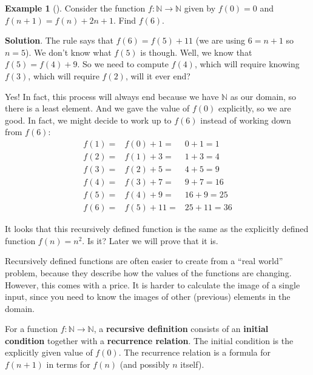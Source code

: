 \documentclass[10pt,]{book}
\newcommand{\terminology}[1]{\textbf{#1}}
\theoremstyle{plain}
\theoremstyle{definition}
\theoremstyle{definition}
\newtheorem{example}[theorem]{Example}
\theoremstyle{definition}
\theoremstyle{definition}
\numberwithin{equation}{chapter}
\def\N{\mathbb N}
\newcommand{\amp}{&}
\begin{document}
\begin{example}[]\label{example-48}
\hypertarget{p-1616}{}%
Consider the function \(f:\N \to \N\) given by \(f(0) = 0\) and \(f(n+1) = f(n) + 2n+1\).  Find \(f(6)\).%
\par\smallskip%
\noindent\textbf{Solution}.\hypertarget{solution-141}{}\quad%
\hypertarget{p-1617}{}%
The rule says that \(f(6) = f(5) + 11\) (we are using \(6 = n+1\) so \(n = 5\)).  We don't know what \(f(5)\) is though.  Well, we know that \(f(5) = f(4) + 9\).  So we need to compute \(f(4)\), which will require knowing \(f(3)\), which will require \(f(2)\),\textellipsis{} will it ever end?%
\par
\hypertarget{p-1618}{}%
Yes!  In fact, this process will always end because we have \(\N\) as our domain, so there is a least element.  And we gave the value of \(f(0)\) explicitly, so we are good.  In fact, we might decide to work up to \(f(6)\) instead of working down from \(f(6)\):%
\begin{align*}
f(1) = \amp f(0) + 1 = \amp 0 + 1 = 1\\
f(2) = \amp f(1) + 3 = \amp 1 + 3 = 4\\
f(3) = \amp f(2) + 5 = \amp 4 + 5 = 9\\
f(4) = \amp f(3) + 7 = \amp 9 + 7 = 16\\
f(5) = \amp f(4) + 9 = \amp 16 + 9 = 25\\
f(6) = \amp f(5) + 11 = \amp 25 + 11 = 36
\end{align*}
%
\par
\hypertarget{p-1619}{}%
It looks that this recursively defined function is the same as the explicitly defined function \(f(n) = n^2\).  Is it?  Later we will prove that it is.%
\end{example}
\hypertarget{p-1620}{}%
Recursively defined functions are often easier to create from a ``real world'' problem, because they describe how the values of the functions are changing.  However, this comes with a price. It is harder to calculate the image of a single input, since you need to know the images of other (previous) elements in the domain.%
\begin{assemblage}\label{assemblage-26}
\hypertarget{p-1621}{}%
For a function \(f:\N \to \N\), a \terminology{recursive definition} consists of an \terminology{initial condition} together with a \terminology{recurrence relation}.  The initial condition is the explicitly given value of \(f(0)\). The recurrence relation is a formula for \(f(n+1)\) in terms for \(f(n)\) (and possibly \(n\) itself).%
\end{assemblage}
\end{document}
